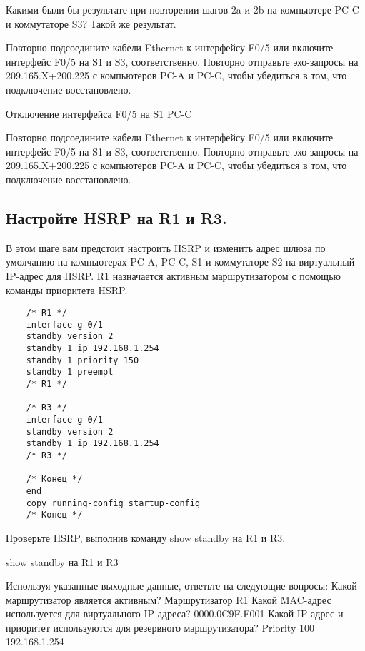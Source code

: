 Какими были бы результате при повторении шагов 2a и 2b на компьютере PC-C и коммутаторе S3?
Такой же результат.

Повторно подсоедините кабели Ethernet к интерфейсу F0/5 или включите интерфейс F0/5 на S1 и S3, соответственно.
Повторно отправьте эхо-запросы на 209.165.X+200.225 с компьютеров PC-A и PC-C, чтобы убедиться в том, что подключение восстановлено.

\begin{image}
    \caption{Отключение интерфейса F0/5 на S1 PC-C}
\end{image}

Повторно подсоедините кабели Ethernet к интерфейсу F0/5 или включите интерфейс F0/5 на S1
и S3, соответственно. Повторно отправьте эхо-запросы на 209.165.X+200.225 с компьютеров
PC-A и PC-C, чтобы убедиться в том, что подключение восстановлено.

\subsection{Настройте HSRP на R1 и R3.}
В этом шаге вам предстоит настроить HSRP и изменить адрес шлюза по умолчанию на компьютерах
PC-A, PC-C, S1 и коммутаторе S2 на виртуальный IP-адрес для HSRP. R1 назначается активным
маршрутизатором с помощью команды приоритета HSRP.

\begin{verbatim}
    /* R1 */
    interface g 0/1
    standby version 2
    standby 1 ip 192.168.1.254
    standby 1 priority 150
    standby 1 preempt
    /* R1 */

    /* R3 */
    interface g 0/1
    standby version 2
    standby 1 ip 192.168.1.254
    /* R3 */

    /* Конец */
    end
    copy running-config startup-config
    /* Конец */
\end{verbatim}

Проверьте HSRP, выполнив команду show standby на R1 и R3.

\begin{image}
    \caption{show standby на R1 и R3}
\end{image}

Используя указанные выходные данные, ответьте на следующие вопросы:
Какой маршрутизатор является активным?
Маршрутизатор R1
Какой MAC-адрес используется для виртуального IP-адреса?
0000.0C9F.F001
Какой IP-адрес и приоритет используются для резервного маршрутизатора?
Priority 100
192.168.1.254

